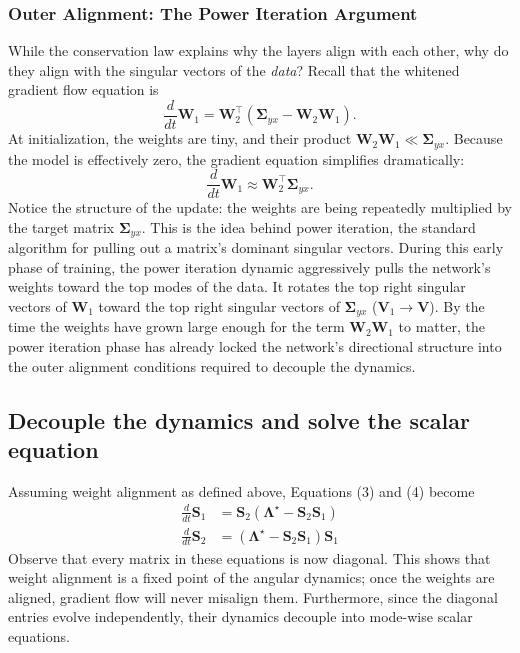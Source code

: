 \documentclass[12pt]{article}
\newcommand{\mW}{\mathbf{W}}
\newcommand{\mV}{\mathbf{V}}
\newcommand{\mS}{\mathbf{S}}
\newcommand{\mLambda}{\boldsymbol{\Lambda}}
\newcommand{\mSigma}{\boldsymbol{\Sigma}}
\begin{document}
\subsubsection*{Outer Alignment: The Power Iteration Argument}

While the conservation law explains why the layers align with each other, why do they align with the singular vectors of the \emph{data}? Recall that the whitened gradient flow equation is
\begin{equation}
    \frac{d}{dt}\mW_1 = \mW_2^\top(\mSigma_{yx} - \mW_2 \mW_1).
\end{equation}
At initialization, the weights are tiny, and their product $\mW_2 \mW_1 \ll \mSigma_{yx}$. Because the model is effectively zero, the gradient equation simplifies dramatically:
\begin{equation}
    \frac{d}{dt}\mW_1 \approx \mW_2^\top \mSigma_{yx}.
\end{equation}
Notice the structure of the update: the weights are being repeatedly multiplied by the target matrix $\mSigma_{yx}$. This is the idea behind power iteration, the standard algorithm for pulling out a matrix's dominant singular vectors. During this early phase of training, the power iteration dynamic aggressively pulls the network's weights toward the top modes of the data. It rotates the top right singular vectors of $\mW_1$ toward the top right singular vectors of $\mSigma_{yx}$ ($\mV_1 \to \mV$). By the time the weights have grown large enough for the term $\mW_2 \mW_1$ to matter, the power iteration phase has already locked the network's directional structure into the outer alignment conditions required to decouple the dynamics.

\subsection{Decouple the dynamics and solve the scalar equation}

Assuming weight alignment as defined above, Equations (3) and (4) become
\begin{align}
    \frac{d}{dt}\mS_1 &= \mS_2 (\mLambda^\star - \mS_{2}\mS_{1}) \tag{7} \\
    \frac{d}{dt}\mS_2 &= (\mLambda^\star - \mS_{2}\mS_{1}) \mS_{1} \tag{8}
\end{align}
Observe that every matrix in these equations is now diagonal. This shows that weight alignment is a fixed point of the angular dynamics; once the weights are aligned, gradient flow will never misalign them. Furthermore, since the diagonal entries evolve independently, their dynamics decouple into mode-wise scalar equations.
\end{document}
